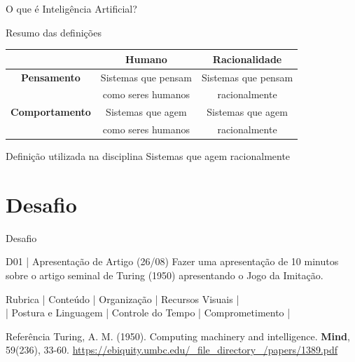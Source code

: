 \documentclass[xcolor=dvipsnames,table]{beamer}
\begin{document}
	\begin{frame}{O que é Inteligência Artificial?}
		\begin{block}{Resumo das definições}
			\begin{tabular}{c|cc}
										& {\bf Humano} 			& {\bf Racionalidade} \\
				\hline
				{\bf Pensamento}		& Sistemas que pensam	& Sistemas que pensam \\
										& como seres humanos	& racionalmente \\
				\hline
				{\bf Comportamento}		& Sistemas que agem 	& {\color{blue} Sistemas que agem}\\
										& como seres humanos	& {\color{blue}racionalmente}\\
				\hline
			\end{tabular}
		\end{block}	
		\begin{exampleblock}{Definição utilizada na disciplina}
			Sistemas que agem racionalmente
		\end{exampleblock}					
	\end{frame}

    \section{Desafio}
    \begin{frame}{Desafio}
        \begin{block}{D01 | Apresentação de Artigo (26/08)}
            Fazer uma apresentação de 10 minutos sobre o artigo seminal de Turing (1950) apresentando o Jogo da Imitação.
        \end{block} 
        \begin{block}{Rubrica}
            | Conteúdo | Organização | Recursos Visuais | \\
            | Postura e Linguagem | Controle do Tempo | Comprometimento |        
        \end{block}
        \begin{block}{Referência}
            Turing, A. M. (1950). Computing machinery and intelligence. {\bf Mind}, 59(236), 33-60. \url{https://ebiquity.umbc.edu/_file_directory_/papers/1389.pdf}
        \end{block}
    \end{frame}
	
	\begin{frame}
		\titlepage
	\end{frame}
	
\end{document}
